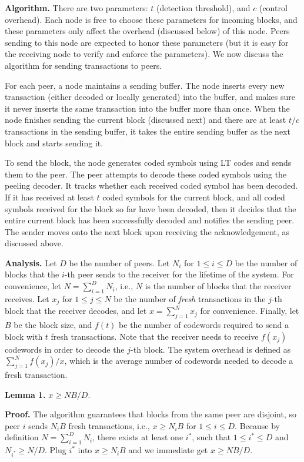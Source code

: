 \documentclass{article}
\begin{document}
\noindent
\textbf{Algorithm.} There are two parameters: $t$ (detection threshold), and
$c$ (control overhead). Each node is free to choose these parameters for
incoming blocks, and these parameters only affect the overhead (discussed
below) of this node. Peers sending to this node are expected to honor these
parameters (but it is easy for the receiving node to verify and enforce
the parameters). We now discuss the algorithm for sending transactions to peers.

\smallskip
For each peer, a node maintains a sending buffer. The node inserts every new
transaction (either decoded or locally generated) into the buffer, and makes
sure it never inserts the same transaction into the buffer more than once.
When the node finishes sending the current block (discussed next) and there
are at least $t/c$ transactions in the sending buffer, it takes the entire
sending buffer as the next block and starts sending it.

\smallskip
To send the block, the node generates coded symbols using LT codes and sends
them to the peer. The peer attempts to decode these coded symbols using the
peeling decoder. It tracks whether each received coded symbol has been decoded.
If it has received at least $t$ coded symbols for the current block, and all
coded symbols received for the block so far have been decoded, then it decides
that the entire current block has been successfully decoded and notifies the
sending peer. The sender moves onto the next block upon receiving the
acknowledgement, as discussed above.


\smallskip\noindent\textbf{Analysis.}
Let $D$ be the number of peers. Let $N_i$ for $1 \le i \le D$ be the number of
blocks that the $i$-th peer sends to the receiver for the lifetime of the
system. For convenience, let $N = \sum_{i=1}^D N_i$, i.e., $N$ is the number of
blocks that the receiver receives.  Let $x_j$ for $1 \le j \le N$ be the number
of \emph{fresh} transactions in the $j$-th block that the receiver decodes, and
let $x=\sum_{j=1}^N x_j$ for convenience.  Finally, let $B$ be the block size,
and $f(t)$ be the number of codewords required to send a block with $t$ fresh
transactions. Note that the receiver needs to receive $f(x_j)$ codewords in
order to decode the $j$-th block. The system overhead is defined as
$\sum_{j=1}^N f(x_j)/x$, which is the average number of codewords needed to
decode a fresh transaction.

\smallskip
\noindent
\textbf{Lemma 1.} $x \ge NB/D.$

\smallskip
\noindent \textbf{Proof.} The algorithm guarantees that blocks from the same
peer are disjoint, so peer $i$ sends $N_i B$ fresh transactions, i.e., $x \ge
N_i B$ for $1 \le i \le D$. Because by definition $N=\sum_{i=1}^D N_i$, there
exists at least one $i^*$, such that $1 \le i^* \le D$ and $N_{i^*} \ge N/D$.
Plug $i^*$ into $x \ge N_i B$ and we immediate get $x \ge NB/D$.
\end{document}
